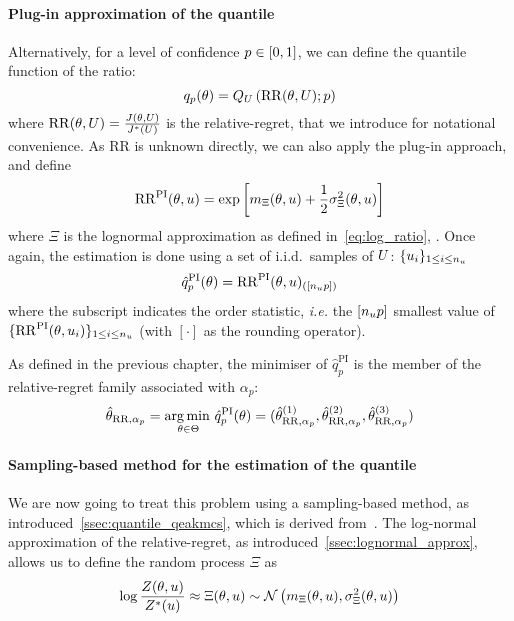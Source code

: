 \documentclass[../../Main_ManuscritThese.tex]{subfiles}
\begin{document}
\paragraph{Plug-in approximation of the quantile}
Alternatively, for a level of confidence
$p \in \interval{0}{1}$, we can define the quantile function of the
ratio:
\begin{equation}
  q_p(\theta) = Q_{U}\left(\mathrm{RR}(\theta, U);p \right)
\end{equation}
where $\mathrm{RR}(\theta, U)=\frac{J(\theta, U)}{J^*(U)}$ is the
relative-regret, that we introduce for notational convenience.  As
$\mathrm{RR}$ is unknown directly, we can also apply the plug-in
approach, and define
\begin{equation}
  \mathrm{RR}^{\mathrm{PI}}(\theta, u) = \exp\left[m_{\Xi}(\theta, u) + \frac{1}{2}\sigma^2_{\Xi}(\theta, u)\right]
\end{equation}
where $\Xi$ is the lognormal approximation as defined
in~\cref{eq:log_ratio}, . Once again, the
estimation is done using a set of i.i.d.\ samples of $U$:
$\{u_i\}_{1\leq i \leq n_{u}}$
\begin{equation}
  \label{eq:RRPI}
  \hat{q}_p^{\mathrm{PI}}(\theta) = {\mathrm{RR}}^{\mathrm{PI}}(\theta, u)_{(\left[n_{u}p\right])}
\end{equation}
where the subscript indicates the order statistic, \emph{i.e.} the
$\left[n_{u}p\right]$ smallest value of
$\{\mathrm{RR}^\mathrm{PI}(\theta,u_i)\}_{1\leq i\leq n_u}$ (with
$[\cdot]$ as the rounding operator). 

As defined in the previous chapter, the minimiser of
$\hat{q}_p^{\mathrm{PI}}$ is the member of the relative-regret family
associated with $\alpha_p$:
\begin{equation}
  \hat{\theta}_{\mathrm{RR},\alpha_p} = \operatorname*{arg\,min \,}_{\theta \in \Theta} \hat{q}^{\mathrm{PI}}_p(\theta) = (\hat{\theta}^{(1)}_{\mathrm{RR},\alpha_p}, \hat{\theta}^{(2)}_{\mathrm{RR},\alpha_p},\hat{\theta}^{(3)}_{\mathrm{RR},\alpha_p})
\end{equation}
\paragraph{Sampling-based method for the estimation of the quantile}
We are now going to treat this problem using a sampling-based method,
as introduced~\cref{ssec:quantile_qeakmcs}, which is derived
from~\cite{razaaly_rare_2019}.  The log-normal approximation of the
relative-regret, as introduced~\cref{ssec:lognormal_approx}, allows us
to define the random process $\Xi$ as
\begin{equation}
  \log \frac{Z(\theta, u)}{Z^*(u)} \approx \Xi(\theta, u) \sim \mathcal{N}\left(m_{\Xi}(\theta, u),\sigma^2_{\Xi}(\theta, u)\right)
\end{equation}
\end{document}
